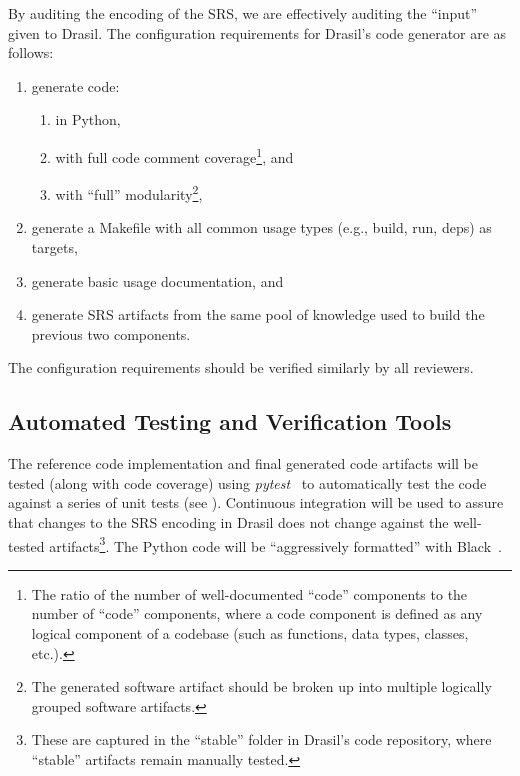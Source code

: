 \documentclass[12pt, titlepage]{article}
\begin{document}
By auditing the encoding of the SRS, we are effectively auditing the ``input''
given to Drasil. The configuration requirements for Drasil's code generator are
as follows:

\begin{enumerate}

    \item generate code:

          \begin{enumerate}

              \item in Python,

              \item with full code comment coverage\footnote{The ratio of the
                        number of well-documented ``code'' components to the
                        number of ``code'' components, where a code component is
                        defined as any logical component of a codebase (such as
                        functions, data types, classes, etc.).}, and

              \item with ``full'' modularity\footnote{The generated software
                        artifact should be broken up into multiple logically
                        grouped software artifacts.},

          \end{enumerate}

    \item generate a Makefile with all common usage types (e.g., build, run,
          deps) as targets,

    \item generate basic usage documentation, and

    \item generate SRS artifacts from the same pool of knowledge used to build
          the previous two components.

\end{enumerate}

The configuration requirements should be verified similarly by all reviewers.

\subsection{Automated Testing and Verification Tools}

The reference code implementation and final generated code artifacts will be
tested (along with code coverage) using \textit{pytest}~\cite{PyTest} to
automatically test the code against a series of unit tests (see
). Continuous integration will be used to assure
that changes to the SRS encoding in Drasil does not change against the
well-tested artifacts\footnote{These are captured in the ``stable'' folder in
Drasil's code repository, where ``stable'' artifacts remain manually tested.}.
The Python code will be ``aggressively formatted'' with
Black~\cite{PythonBlack}.
\end{document}

